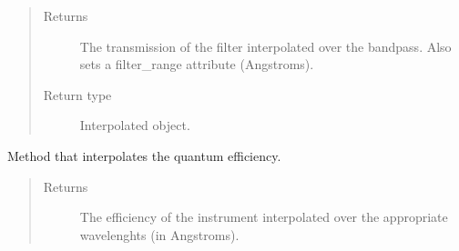 \documentclass[letterpaper,10pt,english]{sphinxmanual}
\begin{document}
\begin{fulllineitems}
\begin{fulllineitems}
\begin{quote}
\begin{description}
\begin{itemize}
\end{itemize}

\end{description}\end{quote}
\begin{quote}\begin{description}
\item[{Returns}] \leavevmode
The transmission of the filter interpolated over the bandpass. Also sets a filter\_range attribute (Angstroms).

\item[{Return type}] \leavevmode
Interpolated object.

\end{description}\end{quote}

\end{fulllineitems}


\begin{fulllineitems}
\label{\detokenize{modules:arc.Instrument.interpolate_efficiency}}
Method that interpolates the quantum efficiency.
\begin{quote}\begin{description}
\item[{Returns}] \leavevmode
The efficiency of the instrument interpolated over the appropriate wavelenghts (in Angstroms).

\end{description}\end{quote}

\end{fulllineitems}


\end{fulllineitems}



\subsubsection{}
\label{\detokenize{modules:telescope}}
\end{document}
